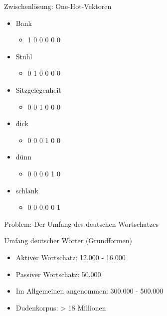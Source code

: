 \documentclass{beamer}
\begin{document}
\begin{frame}[c]{Zwischenlösung: One-Hot-Vektoren}
\begin{itemize}
	\item Bank
	\begin{itemize}
		\item 1 0 0 0 0 0
	\end{itemize}
	\item Stuhl
	\begin{itemize}
		\item 0 1 0 0 0 0
	\end{itemize}
	\item Sitzgelegenheit
	\begin{itemize}
		\item 0 0 1 0 0 0
	\end{itemize}
	\item dick
	\begin{itemize}
		\item 0 0 0 1 0 0
	\end{itemize}
	\item dünn
	\begin{itemize}
		\item 0 0 0 0 1 0 
	\end{itemize}
	\item schlank
	\begin{itemize}
		\item 0 0 0 0 0 1 
	\end{itemize}
\end{itemize}
\end{frame}

\begin{frame}[c]{Problem: Der Umfang des deutschen Wortschatzes}
	
Umfang deutscher Wörter (Grundformen)

\vspace{0.5cm}

	\begin{itemize}
		\item<2-> Aktiver Wortschatz: 12.000 - 16.000
		\item<3-> Passiver Wortschatz: 50.000
		\item<4-> Im Allgemeinen angenommen: 300.000 - 500.000
		\item<5-> Dudenkorpus: > 18 Millionen
	\end{itemize}

\vspace{0.5cm}

\end{frame}
\end{document}

